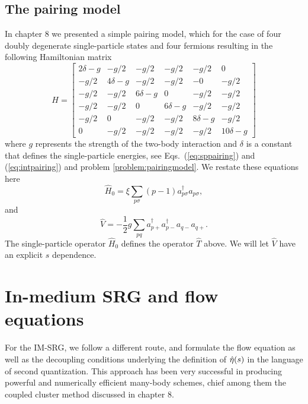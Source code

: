 \subsection{The pairing model}
In chapter 8 we presented a simple pairing model, which for the case of four doubly degenerate single-particle states and 
four fermions resulting in the following Hamiltonian matrix
 \[
  H = \begin{bmatrix}
  2\delta -g & -g/2 & -g/2 & -g/2 & -g/2 & 0 \\ -g/2 & 4\delta -g &
  -g/2 & -g/2 & -0 & -g/2 \\ -g/2 & -g/2 & 6\delta -g & 0 & -g/2 &
  -g/2 \\ -g/2 & -g/2 & 0 & 6\delta-g & -g/2 & -g/2 \\ -g/2 & 0 & -g/2
  & -g/2 & 8\delta-g & -g/2 \\ 0 & -g/2 & -g/2 & -g/2 & -g/2 &
  10\delta -g
  \end{bmatrix}
  \]
where $g$ represents the strength of the two-body interaction and $\delta$ is a constant that defines the single-particle energies, see Eqs.~(\ref{eq:sppairing}) and 
(\ref{eq:intpairing}) and problem \ref{problem:pairingmodel}. 
We restate these equations here
 \[
  \hat{H}_0 = \xi \sum_{p \sigma} (p-1) a^{\dagger}_{p \sigma} a_{p\sigma},
  \]
and 
  \[
  \hat{V} = -\frac{1}{2}g \sum_{pq} a^{\dagger}_{p+}a^{\dagger}_{p-}a_{q-}a_{q+}.
  \]
The single-particle operator $\hat{H}_0$ defines the operator $\hat{T}$ above. We will let $\hat{V}$ have an explicit $s$ dependence. 



\section{In-medium SRG and flow equations}
For the IM-SRG, we follow a different route, and formulate the flow equation as well as the decoupling conditions underlying the definition of $\hat{\eta}(s)$ in the language of second quantization. This approach has been very successful in producing powerful and numerically efficient many-body schemes, chief among them the coupled cluster method discussed in chapter 8.

